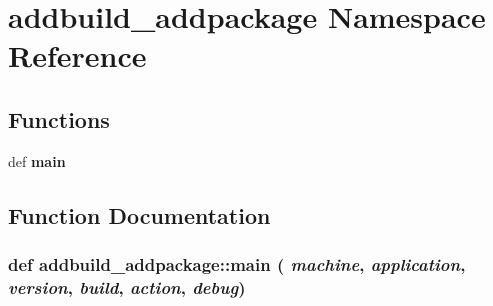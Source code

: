 \section{addbuild\_\-addpackage Namespace Reference}
\label{namespaceaddbuild__addpackage}


\subsection*{Functions}
\begin{CompactItemize}
\item 
def {\bf main}
\end{CompactItemize}


\subsection{Function Documentation}
\subsubsection{\setlength{\rightskip}{0pt plus 5cm}def addbuild\_\-addpackage::main ( {\em machine},  {\em application},  {\em version},  {\em build},  {\em action},  {\em debug})}\label{namespaceaddbuild__addpackage_1c32b3dea5959caf9a453172233a587e}


